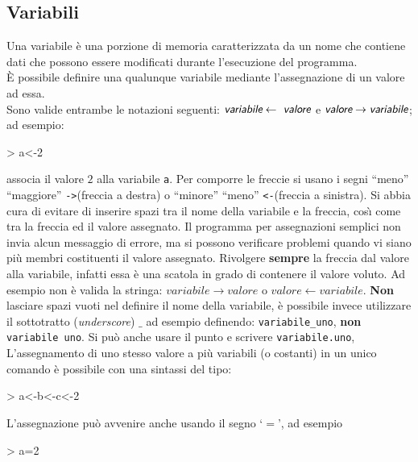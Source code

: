 \documentclass[onecolumn,11pt]{book}
\newcommand{\varia}[1]{\textsl{\textsf{#1}}}
\begin{document}
\subsection{Variabili}
Una variabile \`e una porzione di memoria caratterizzata da un nome che contiene dati che possono essere modificati durante l'esecuzione del programma.\\ \`E  possibile definire una qualunque variabile mediante l'assegnazione di un valore ad essa.\\
Sono valide entrambe le notazioni seguenti:
$ \varia{variabile}\leftarrow\varia{ valore}$ e
$\varia{valore} \to  \varia{variabile}$;
ad esempio:
\begin{Schunk}
\begin{Sinput}
> a<-2 
\end{Sinput}
\end{Schunk}
associa il valore $2$ alla variabile \texttt{a}. Per comporre le freccie si usano i segni ``meno'' ``maggiore''  \texttt{->}(freccia a destra) o ``minore'' ``meno''  \texttt{<-}(freccia a sinistra).
Si abbia cura di evitare di inserire spazi tra il nome della variabile e la freccia, cos\`\i \; come tra la freccia ed il valore assegnato. Il programma per assegnazioni semplici non invia  alcun messaggio di errore, ma si possono verificare problemi quando vi siano pi\`u membri costituenti il valore assegnato.
Rivolgere {\bf sempre} la freccia dal valore alla variabile, infatti essa \`e una scatola in grado di contenere il valore voluto. Ad esempio non \`e valida la stringa:
$variabile\rightarrow valore $ o $ valore\leftarrow variabile$.
{\bf Non} lasciare spazi vuoti nel definire il nome della variabile, \`e possibile invece utilizzare  il sottotratto (\textit{underscore}) $\_$  ad esempio definendo: \texttt{variabile\_uno}, {\bf non} \texttt{variabile uno}. Si pu\`o anche usare il punto e scrivere  \texttt{variabile.uno}, \\  L'assegnamento di uno stesso valore a pi\`u variabili (o costanti) in un unico comando \`e possibile con una sintassi del tipo: 
\begin{Schunk}
\begin{Sinput}
> a<-b<-c<-2 
\end{Sinput}
\end{Schunk}
L'assegnazione pu\`o avvenire anche usando il segno `$=$', ad esempio
\begin{Schunk}
\begin{Sinput}
> a=2 
\end{Sinput}
\end{Schunk}
\end{document}
